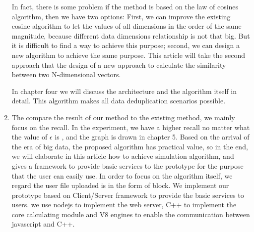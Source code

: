 \begin{englishabstract}
\begin{enumerate}
        In fact, there is some problem if the method is based on the law of cosines algorithm, then we have two options: First, we can improve the existing cosine algorithm to let the values of all dimensions in the order of the same magnitude, because different data dimensions relationship is not that big. But it is difficult to find a way to achieve this purpose; second, we can design a new algorithm to achieve the same purpose. This article will take the second approach that the design of a new approach to calculate the similarity between two N-dimensional vectors.

        In chapter four we will discuss the architecture and the algorithm itself in detail. This algorithm makes all data deduplication scenarios possible.

    \item The compare the result of our method to the existing method, we mainly focus on the recall. In the experiment, we have a higher recall no matter what the value of $\epsilon$ is , and the graph is drawn in chapter 5. Based on the arrival of the era of big data, the proposed algorithm has practical value, so in the end, we will elaborate in this article how to achieve simulation algorithm, and gives a framework to provide basic services to the prototype for the purpose that the user can easily use. In order to focus on the algorithm itself, we regard the user file uploaded is in the form of block. We implement our prototype based on Client/Server framework to provide the basic services to users. we use nodejs to implement the web server, C++ to implement the core calculating module and V8 engines to enable the communication between javascript and C++.
\end{enumerate}

\end{englishabstract}

